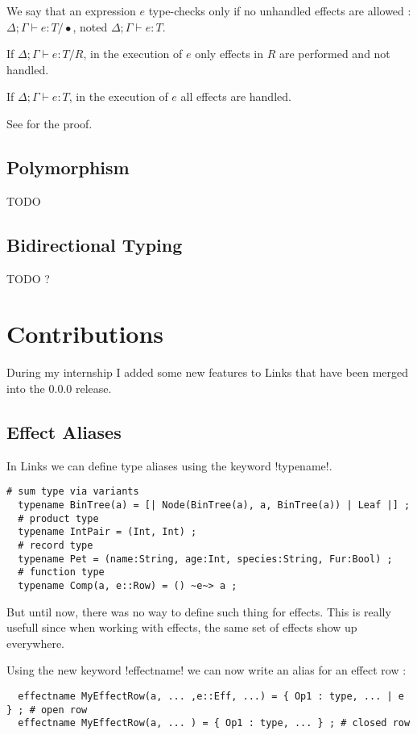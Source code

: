 \documentclass[11pt, nonacm=true, language=french, language=english]{acmart}
\begin{document}
We say that an expression $e$ type-checks only if no unhandled effects are allowed : $\Delta;\Gamma \vdash e : T / \bullet$, noted $\Delta;\Gamma \vdash e : T$.


\begin{thm}
  If $\Delta;\Gamma \vdash e : T / R$, in the execution of $e$ only effects in $R$ are performed and not handled.
\end{thm}
\begin{cor}
  If $\Delta;\Gamma \vdash e : T$, in the execution of $e$ all effects are handled.
\end{cor}

See \citep{} for the proof.


\subsection{Polymorphism} TODO

\subsection{Bidirectional Typing} TODO ?


\section{Contributions}

During my internship I added some new features to Links that have been merged into the 0.0.0 release.

\subsection{Effect Aliases}

In Links we can define type aliases using the keyword !typename!.
\begin{lstlisting}[caption=Type alias examples]
  # sum type via variants
  typename BinTree(a) = [| Node(BinTree(a), a, BinTree(a)) | Leaf |] ;
  # product type
  typename IntPair = (Int, Int) ;
  # record type
  typename Pet = (name:String, age:Int, species:String, Fur:Bool) ;
  # function type
  typename Comp(a, e::Row) = () ~e~> a ;
\end{lstlisting}

But until now, there was no way to define such thing for effects. This is really usefull since when working with effects, the same set of effects show up everywhere.

Using the new keyword !effectname! we can now write an alias for an effect row :
\begin{lstlisting}
  effectname MyEffectRow(a, ... ,e::Eff, ...) = { Op1 : type, ... | e } ; # open row
  effectname MyEffectRow(a, ... ) = { Op1 : type, ... } ; # closed row
\end{lstlisting}
\end{document}
